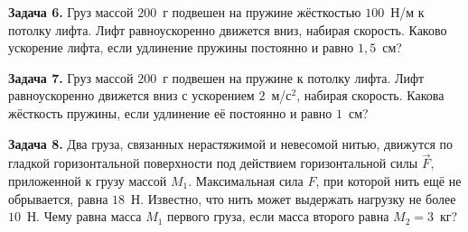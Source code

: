 \begin{taskbasic}[code={\label{task:newton2_v27_n22}}]
\textbf{Задача 6.} Груз массой $200$~г подвешен на пружине жёсткостью $100$~Н/м к потолку лифта. Лифт равноускоренно движется вниз, набирая скорость. Каково ускорение лифта, если удлинение пружины постоянно и равно $1{,}5$~см?

\end{taskbasic}

\begin{taskbasic}[code={\label{task:newton2_v28_n22}}]
\textbf{Задача 7.} Груз массой $200$~г подвешен на пружине к потолку лифта. Лифт равноускоренно движется вниз с ускорением $2$~м/с$^{2}$, набирая скорость. Какова жёсткость пружины, если удлинение её постоянно и равно $1$~см?

\end{taskbasic}

\begin{taskbasic}[code={\label{task:newton2_v29_n22}}]
\textbf{Задача 8.} Два груза, связанных нерастяжимой и невесомой нитью, движутся по гладкой горизонтальной поверхности под действием горизонтальной силы $\vec{F}$, приложенной к грузу массой $M_1$. Максимальная сила $F$, при которой нить ещё не обрывается, равна $18$~Н. Известно, что нить может выдержать нагрузку не более $10$~Н. Чему равна масса $M_1$ первого груза, если масса второго равна $M_2 = 3$~кг?

\nopagebreak\smallskip
\begin{center}
\end{center}
\end{taskbasic}



